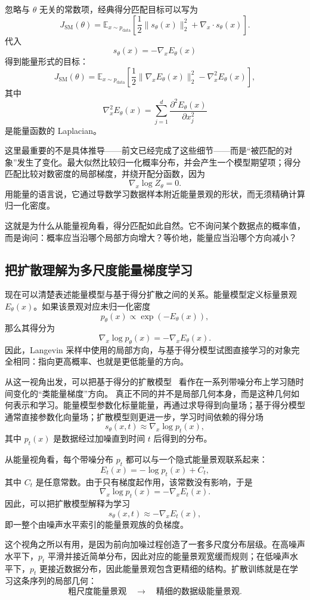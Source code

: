 忽略与 $\theta$ 无关的常数项，经典得分匹配目标可以写为
\[
J_{\mathrm{SM}}(\theta)
=
\mathbb{E}_{x\sim p_{\text{data}}}
\left[
\frac{1}{2}\|s_\theta(x)\|_2^2
+
\nabla_x\cdot s_\theta(x)
\right].
\]
代入
\[
s_\theta(x)=-\nabla_xE_\theta(x)
\]
得到能量形式的目标：
\[
\boxed{
J_{\mathrm{SM}}(\theta)
=
\mathbb{E}_{x\sim p_{\text{data}}}
\left[
\frac{1}{2}
\|\nabla_xE_\theta(x)\|_2^2
-
\nabla_x^2E_\theta(x)
\right],
}
\]
其中
\[
\nabla_x^2E_\theta(x)
=
\sum_{j=1}^d
\frac{\partial^2E_\theta(x)}{\partial x_j^2}
\]
是能量函数的 Laplacian。

这里最重要的不是具体推导——前文已经完成了这些细节——而是“被匹配的对象”发生了变化。最大似然比较归一化概率分布，并会产生一个模型期望项；得分匹配比较对数密度的局部梯度，并绕开配分函数，因为
\[
\nabla_x\log Z_\theta=0.
\]
用能量的语言说，它通过导数学习数据样本附近能量景观的形状，而无须精确计算归一化密度。

这就是为什么从能量视角看，得分匹配如此自然。它不询问某个数据点的概率值，而是询问：概率应当沿哪个局部方向增大？等价地，能量应当沿哪个方向减小？

\subsection{把扩散理解为多尺度能量梯度学习}

现在可以清楚表述能量模型与基于得分扩散之间的关系。能量模型定义标量景观 $E_\theta(x)$。如果该景观对应未归一化密度
\[
p_\theta(x)\propto \exp(-E_\theta(x)),
\]
那么其得分为
\[
\nabla_x\log p_\theta(x)
=
-\nabla_xE_\theta(x).
\]
因此，Langevin 采样中使用的局部方向，与基于得分模型试图直接学习的对象完全相同：指向更高概率、也就是更低能量的方向。

从这一视角出发，可以把基于得分的扩散模型~\cite{song2019generative,song2021scorebased} 看作在一系列带噪分布上学习随时间变化的“类能量梯度”方向。
真正不同的并不是局部几何本身，而是这种几何如何表示和学习。能量模型参数化标量能量，再通过求导得到向量场；基于得分模型通常直接参数化向量场；扩散模型则更进一步，学习时间依赖的得分场
\[
s_\theta(x,t)
\approx
\nabla_x\log p_t(x),
\]
其中 $p_t(x)$ 是数据经过加噪直到时间 $t$ 后得到的分布。

从能量视角看，每个带噪分布 $p_t$ 都可以与一个隐式能量景观联系起来：
\[
E_t(x)
=
-\log p_t(x)+C_t,
\]
其中 $C_t$ 是任意常数。由于只有梯度起作用，该常数没有影响，于是
\[
\nabla_x\log p_t(x)
=
-\nabla_xE_t(x).
\]
因此，可以把扩散模型解释为学习
\[
s_\theta(x,t)
\approx
-\nabla_xE_t(x),
\]
即一整个由噪声水平索引的能量景观族的负梯度。

这个视角之所以有用，是因为前向加噪过程创造了一套多尺度分布层级。在高噪声水平下，$p_t$ 平滑并接近简单分布，因此对应的能量景观宽缓而规则；在低噪声水平下，$p_t$ 更接近数据分布，因此能量景观包含更精细的结构。扩散训练就是在学习这条序列的局部几何：
\[
\text{粗尺度能量景观}
\quad\longrightarrow\quad
\text{精细的数据级能量景观}.
\]

